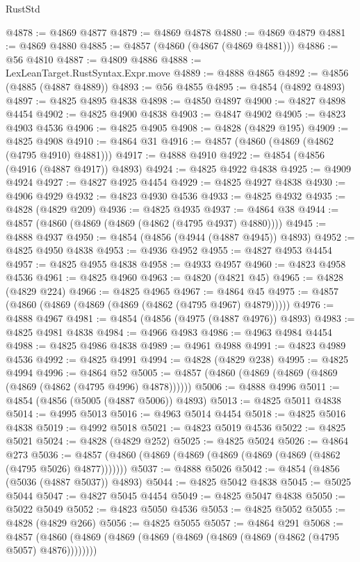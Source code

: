 \begin{lexlean}{RustStd}
\begin{coremodule}
{\begin{coremodule}
{{{{{{{{{{{{{{{{{{{{{{{{{{{{{{{{{{{{{{{{{{{{{{{{{{{{{{{{{{{{{{{{{{{{{{{{{{{{{{{{@4878 := @4869 @4877
@4879 := @4869 @4878
@4880 := @4869 @4879
@4881 := @4869 @4880
@4885 := @4857 (@4860 (@4867 (@4869 @4881)))
@4886 := @56 @4810
@4887 := @4809 @4886
@4888 := LexLeanTarget.RustSyntax.Expr.move
@4889 := @4888 @4865
@4892 := @4856 (@4885 (@4887 @4889))
@4893 := @56 @4855
@4895 := @4854 (@4892 @4893)
@4897 := @4825 @4895 @4838
@4898 := @4850 @4897
@4900 := @4827 @4898 @4454
@4902 := @4825 @4900 @4838
@4903 := @4847 @4902
@4905 := @4823 @4903 @4536
@4906 := @4825 @4905
@4908 := @4828 (@4829 @195)
@4909 := @4825 @4908
@4910 := @4864 @31
@4916 := @4857 (@4860 (@4869 (@4862 (@4795 @4910) @4881)))
@4917 := @4888 @4910
@4922 := @4854 (@4856 (@4916 (@4887 @4917)) @4893)
@4924 := @4825 @4922 @4838
@4925 := @4909 @4924
@4927 := @4827 @4925 @4454
@4929 := @4825 @4927 @4838
@4930 := @4906 @4929
@4932 := @4823 @4930 @4536
@4933 := @4825 @4932
@4935 := @4828 (@4829 @209)
@4936 := @4825 @4935
@4937 := @4864 @38
@4944 := @4857 (@4860 (@4869 (@4869 (@4862 (@4795 @4937) @4880))))
@4945 := @4888 @4937
@4950 := @4854 (@4856 (@4944 (@4887 @4945)) @4893)
@4952 := @4825 @4950 @4838
@4953 := @4936 @4952
@4955 := @4827 @4953 @4454
@4957 := @4825 @4955 @4838
@4958 := @4933 @4957
@4960 := @4823 @4958 @4536
@4961 := @4825 @4960
@4963 := @4820 (@4821 @45)
@4965 := @4828 (@4829 @224)
@4966 := @4825 @4965
@4967 := @4864 @45
@4975 := @4857 (@4860 (@4869 (@4869 (@4869 (@4862 (@4795 @4967) @4879)))))
@4976 := @4888 @4967
@4981 := @4854 (@4856 (@4975 (@4887 @4976)) @4893)
@4983 := @4825 @4981 @4838
@4984 := @4966 @4983
@4986 := @4963 @4984 @4454
@4988 := @4825 @4986 @4838
@4989 := @4961 @4988
@4991 := @4823 @4989 @4536
@4992 := @4825 @4991
@4994 := @4828 (@4829 @238)
@4995 := @4825 @4994
@4996 := @4864 @52
@5005 := @4857 (@4860 (@4869 (@4869 (@4869 (@4869 (@4862 (@4795 @4996) @4878))))))
@5006 := @4888 @4996
@5011 := @4854 (@4856 (@5005 (@4887 @5006)) @4893)
@5013 := @4825 @5011 @4838
@5014 := @4995 @5013
@5016 := @4963 @5014 @4454
@5018 := @4825 @5016 @4838
@5019 := @4992 @5018
@5021 := @4823 @5019 @4536
@5022 := @4825 @5021
@5024 := @4828 (@4829 @252)
@5025 := @4825 @5024
@5026 := @4864 @273
@5036 := @4857 (@4860 (@4869 (@4869 (@4869 (@4869 (@4869 (@4862 (@4795 @5026) @4877)))))))
@5037 := @4888 @5026
@5042 := @4854 (@4856 (@5036 (@4887 @5037)) @4893)
@5044 := @4825 @5042 @4838
@5045 := @5025 @5044
@5047 := @4827 @5045 @4454
@5049 := @4825 @5047 @4838
@5050 := @5022 @5049
@5052 := @4823 @5050 @4536
@5053 := @4825 @5052
@5055 := @4828 (@4829 @266)
@5056 := @4825 @5055
@5057 := @4864 @291
@5068 := @4857 (@4860 (@4869 (@4869 (@4869 (@4869 (@4869 (@4869 (@4862 (@4795 @5057) @4876))))))))
}}}}}}}}}}}}}}}}}}}}}}}}}}}}}}}}}}}}}}}}}}}}}}}}}}}}}}}}}}}}}}}}}}}}}}}}}}}}}}}}
\end{coremodule}}
\end{coremodule}
\end{lexlean}
